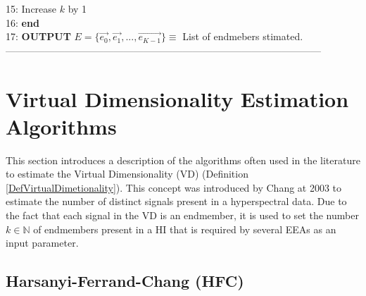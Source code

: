 \documentclass[11pt, oneside]{Thesis} %
\begin{document}
15: \hspace{0.8cm}Increase $k$ by 1\\
16: \hspace{0.15cm}\textbf{end}\\
17: \hspace{0.15cm}\textbf{OUTPUT} $E = \lbrace \vec{e_{0}}, \vec{e_{1}}, ..., \vec{e_{K-1}} \rbrace \equiv$ List of endmebers stimated.\\
\noindent------------------------------------------------------------------------------------------------\\


\newpage

\section{Virtual Dimensionality Estimation Algorithms}

This section introduces a description of the algorithms often used in the 
literature to estimate the Virtual Dimensionality (VD) 
(Definition \ref{DefVirtualDimetionality}). This concept was introduced by Chang 
\cite{VD} at 2003 to estimate the number of distinct signals present in a 
hyperspectral data. Due to the fact that each signal in the VD is an 
endmember, it is used to set the number $k \in \mathbb{N}$ of 
endmembers present in a HI that is required by several EEAs as an input 
parameter.

\subsection{Harsanyi-Ferrand-Chang (HFC)}
\end{document}
